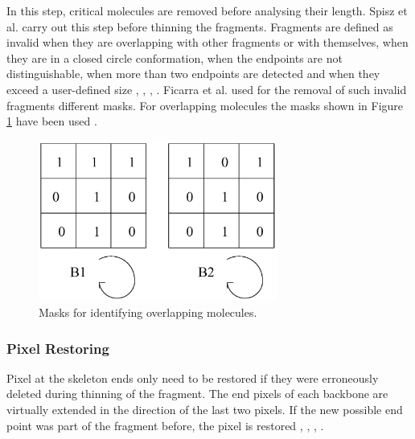 \documentclass{article}
\begin{document}
In this step, critical molecules are removed before analysing their length. Spisz et al. \cite{spisz1998automated} carry out this step before thinning the fragments. Fragments are defined as invalid when they are overlapping with other fragments or with themselves, when they are in a closed circle conformation, when the endpoints are not distinguishable, when more than two endpoints are detected and when they exceed a user-defined size  \cite{spisz1998automated},  \cite{ficarra2005automated},  \cite{ficarra2002automated},  \cite{ficarra2005automatic}. Ficarra et al. used for the removal of such invalid fragments different masks. For overlapping molecules the masks shown in Figure \ref{fig: Masken} have been used  \cite{ficarra2005automated}.

\begin{figure}[htb]
\begin{center}
\includegraphics[width = 0.7\textwidth]{Masken}
\end{center}
\caption{Masks for identifying overlapping molecules. \cite{ficarra2002automated}}
\label{fig: Masken} %
\end{figure}



\subsubsection{Pixel Restoring}\label{sec:IntroPixelRestoring}

Pixel at the skeleton ends only need to be restored if they were erroneously deleted during thinning of the fragment. The end pixels of each backbone are virtually extended in the direction of the last two pixels. If the new possible end point was part of the fragment before, the pixel is restored  \cite{spisz1998automated},  \cite{ficarra2005automated},  \cite{ficarra2002automated},  \cite{ficarra2005automatic}.
\end{document}
